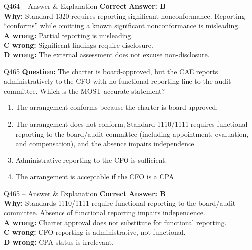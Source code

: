 \documentclass[aspectratio=169,10pt]{beamer}
\begin{document}
	\begin{frame}[t]{Q464 -- Answer \& Explanation}
		\small
		\textbf{Correct Answer: B} \\[4pt]
		\textbf{Why:} Standard 1320 requires reporting significant nonconformance. Reporting ``conforms'' while omitting a known significant nonconformance is misleading. \\[4pt]
		\textbf{A wrong:} Partial reporting is misleading. \\[2pt]
		\textbf{C wrong:} Significant findings require disclosure. \\[2pt]
		\textbf{D wrong:} The external assessment does not excuse non-disclosure.
	\end{frame}
	
	\begin{frame}[t]{Q465}
		\small
		\textbf{Question:} The charter is board-approved, but the CAE reports administratively to the CFO with no functional reporting line to the audit committee. Which is the MOST accurate statement?
		\begin{enumerate}[label=\Alph*.,itemsep=1pt,topsep=2pt]
			\item The arrangement conforms because the charter is board-approved.
			\item The arrangement does not conform; Standard 1110/1111 requires functional reporting to the board/audit committee (including appointment, evaluation, and compensation), and the absence impairs independence.
			\item Administrative reporting to the CFO is sufficient.
			\item The arrangement is acceptable if the CFO is a CPA.
		\end{enumerate}
	\end{frame}
	
	\begin{frame}[t]{Q465 -- Answer \& Explanation}
		\small
		\textbf{Correct Answer: B} \\[4pt]
		\textbf{Why:} Standards 1110/1111 require functional reporting to the board/audit committee. Absence of functional reporting impairs independence. \\[4pt]
		\textbf{A wrong:} Charter approval does not substitute for functional reporting. \\[2pt]
		\textbf{C wrong:} CFO reporting is administrative, not functional. \\[2pt]
		\textbf{D wrong:} CPA status is irrelevant.
	\end{frame}
	
\end{document}
